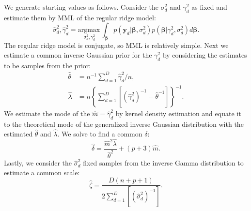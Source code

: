 \documentclass[a4paper,hidelinks]{article}\usepackage[]{graphicx}\usepackage[]{color}
\newcommand{\0}{\bm{0}}
\newcommand{\argmax}{\text{argmax} \,}
\renewcommand{\(}{\left(}
\renewcommand{\)}{\right)}
\renewcommand{\[}{\left[}
\renewcommand{\]}{\right]}
\begin{document}
\begin{appendix}
		We generate starting values as follows. Consider the $\sigma_d^2$ and $\gamma_d^2$ as fixed and estimate them by MML of the regular ridge model:
		$$
		\hat{\sigma}_d^2, \hat{\gamma}_d^2= \underset{\sigma_d^2,\gamma_d^2}{\argmax} \int_{\bm{\beta}} p(\mathbf{y}_d | \bm{\beta}, \sigma_d^2) p(\bm{\beta} | \gamma_d^2, \sigma_d^2) d\bm{\beta}.
		$$
		The regular ridge model is conjugate, so MML is relatively simple. Next we estimate a common inverse Gaussian prior for the $\gamma_d^2$ by considering the estimates to be samples from the prior:
		\begin{align*}
		\hat{\theta} & = n^{-1} \sum_{d=1}^D \hat{\gamma}_d^2 / n, \\
		\hat{\lambda} & = n \left\{\sum_{d=1}^D \[ (\hat{\gamma}_d^2)^{-1} - \hat{\theta}^{-1}\]\right\}^{-1}.
		\end{align*}
		We estimate the mode of the $\hat{m}=\hat{\gamma}_d^2$ by kernel density estimation and equate it to the theoretical mode of the generalized inverse Gaussian distribution with the estimated $\hat{\theta}$ and $\hat{\lambda}$. We solve to find a common $\delta$:
		$$
		\hat{\delta} = \frac{\hat{m}^2 \hat{\lambda}}{\hat{\theta}^2} + (p + 3) \hat{m}.
		$$
		Lastly, we consider the $\hat{\sigma}^2_d$ fixed samples from the inverse Gamma distribution to estimate a common scale:
		$$
		\hat{\zeta} = \frac{D(n + p + 1)}{2 \sum_{d=1}^D[(\hat{\sigma}_d^2)^{-1}]}.
		$$
		

\end{appendix}
\end{document}
